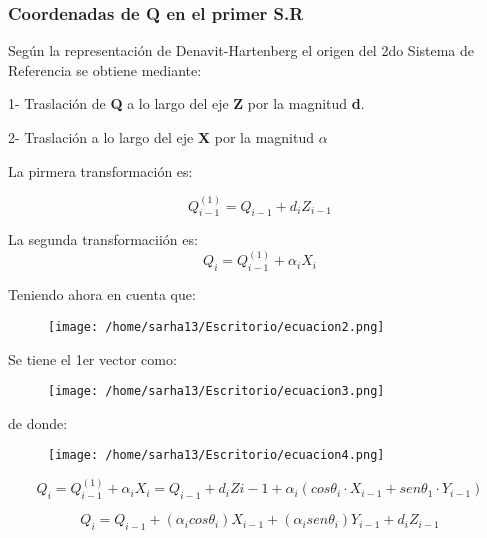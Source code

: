 \documentclass[letter,openright,12pt,spanish]{report}
\begin{document}
\subsubsection{Coordenadas de Q en el primer S.R}

Seg\'un la representaci\'on de Denavit-Hartenberg el origen del 2do Sistema de Referencia se obtiene mediante:

1- Traslaci\'on de \textbf{Q} a lo largo del eje \textbf{Z} por la magnitud \textbf{d}.

2- Traslaci\'on a lo largo del eje \textbf{X} por la magnitud \textbf{$\alpha$}

La pirmera transformaci\'on es:

\begin{displaymath}
Q_{i-1}^{(1)}=Q_{i-1}+d_iZ_{i-1}
\end{displaymath}

La segunda transformacii\'on es:\\

\begin{displaymath}
Q_i=Q_{i-1}^{(1)}+\alpha_iX_i
\end{displaymath}


Teniendo ahora en cuenta que:\\

\begin{figure}[htp]
\centering
\texttt{[image: /home/sarha13/Escritorio/ecuacion2.png]}
\caption{}
\label{}
\end{figure}

Se tiene el 1er vector como:\\

\begin{figure}[htp]
\centering
\texttt{[image: /home/sarha13/Escritorio/ecuacion3.png]}
\caption{}
\label{}
\end{figure}

de donde:

\begin{figure}[htp]
\centering
\texttt{[image: /home/sarha13/Escritorio/ecuacion4.png]}
\caption{}
\label{}
\end{figure}

\begin{displaymath}
Q_i=Q_{i-1}^{(1)}+\alpha_iX_i=Q_{i-1}+d_iZ{i-1}+\alpha_i(cos\theta_i\cdot X_{i-1}+sen\theta_1\cdot Y_{i-1})
\end{displaymath}

\begin{displaymath}
Q_i=Q_{i-1}+(\alpha_icos\theta_i)X_{i-1}+(\alpha_isen\theta_i)Y_{i-1}+d_iZ_{i-1}
\end{displaymath}
\end{document}

